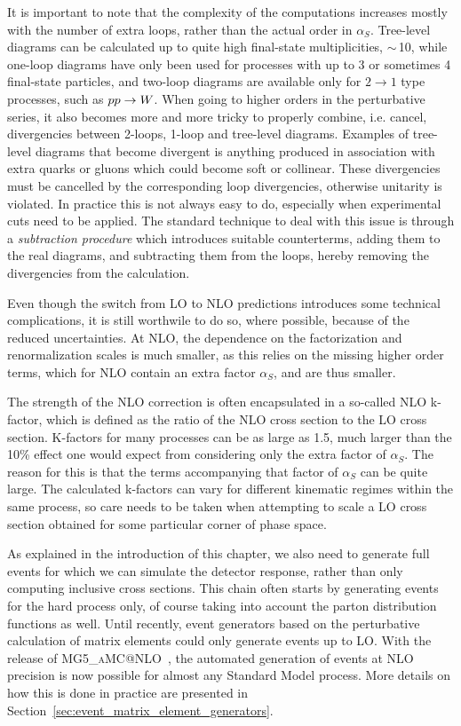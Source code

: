 It is important to note that the complexity of the computations increases mostly with the number of
extra loops, rather than the actual order in $\alpha_S$. 
Tree-level diagrams can be calculated up to quite high final-state multiplicities, $\sim\,$10,
while one-loop diagrams have only been used for processes with up to 3 or sometimes 4 final-state
particles, and two-loop diagrams are available only for $2 \rightarrow 1$ type processes, such as
${p}{p} \rightarrow W$.
When going to higher orders in the perturbative series, it also becomes more and more tricky to
properly combine, i.e. cancel, divergencies between 2-loops, 1-loop and tree-level diagrams. 
Examples of tree-level diagrams that become divergent is anything produced in association with
extra quarks or gluons which could become soft or collinear. These divergencies must be cancelled
by the corresponding loop divergencies, otherwise unitarity is violated. 
In practice this is not always easy to do, especially when experimental cuts need to be applied. 
The standard technique to deal with this issue is through a \textit{subtraction procedure} which
introduces suitable counterterms, adding them to the real diagrams, and subtracting them from the
loops, hereby removing the divergencies from the calculation.


Even though the switch from LO to NLO predictions introduces some technical complications, it is
still worthwile to do so, where possible, because of the reduced uncertainties. 
At NLO, the dependence on the factorization and renormalization scales is much smaller, as this
relies on the missing higher order terms, which for NLO contain an extra factor $\alpha_S$, and are
thus smaller.

The strength of the NLO correction is often encapsulated in a so-called NLO k-factor, which is
defined as the ratio of the NLO cross section to the LO cross section. K-factors for many processes
can be as large as 1.5, much larger than the 10\% effect one would expect from considering only the
extra factor of $\alpha_S$. The reason for this is that the terms accompanying that factor of
$\alpha_S$ can be quite large. 
The calculated k-factors can vary for different kinematic regimes within the same process, so care
needs to be taken when attempting to scale a LO cross section obtained for some particular corner of
phase space. 


As explained in the introduction of this chapter, we also need to generate full events for
which we can simulate the detector response, rather than only computing inclusive cross sections.
This chain often starts by generating events for the hard process only, of course taking into
account the parton distribution functions as well. 
Until recently, event generators based on the perturbative calculation of matrix elements could only
generate events up to LO. 
With the release of \textsc{MG5\_aMC@NLO}~\cite{Alwall:2014hca}, the automated generation of events
at NLO precision is now possible for almost any Standard Model process.
More details on how this is done in practice are presented in
Section~\ref{sec:event_matrix_element_generators}.



